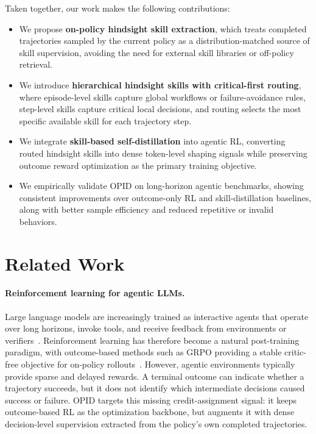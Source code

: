 \documentclass{llmxive}
\begin{document}
Taken together, our work makes the following contributions:
\begin{itemize}
    \item We propose \textbf{on-policy hindsight skill extraction}, which treats completed trajectories sampled by the current policy as a distribution-matched source of skill supervision, avoiding the need for external skill libraries or off-policy retrieval.

    \item We introduce \textbf{hierarchical hindsight skills with critical-first routing}, where episode-level skills capture global workflows or failure-avoidance rules, step-level skills 
    capture critical local decisions, and routing selects the most specific available skill for each trajectory step.

    \item We integrate \textbf{skill-based self-distillation} into agentic RL, converting routed hindsight skills into dense token-level shaping signals while preserving outcome reward optimization as the primary training objective.

    \item We empirically validate OPID on long-horizon agentic benchmarks, showing consistent improvements over outcome-only RL and skill-distillation baselines, along with better sample efficiency and reduced repetitive or invalid behaviors.
\end{itemize}


\section{Related Work}\label{sec:related_work}
\paragraph{Reinforcement learning for agentic LLMs.}
Large language models are increasingly trained as interactive agents that operate over long horizons, invoke tools, and receive feedback from environments or verifiers~\citep{shridhar2020alfworld,yao2022webshop,jin2025searchr1,jimenez2023swebench,wu2026atlas}. Reinforcement learning has therefore become a natural post-training paradigm, with outcome-based methods such as GRPO providing a stable critic-free objective for on-policy rollouts~\citep{shao2024deepseekmath}. However, agentic environments typically provide sparse and delayed rewards. A terminal outcome can indicate whether a trajectory succeeds, but it does not identify which intermediate decisions caused success or failure. OPID targets this missing credit-assignment signal: it keeps outcome-based RL as the optimization backbone, but augments it with dense decision-level supervision extracted from the policy's own completed trajectories.
\end{document}
